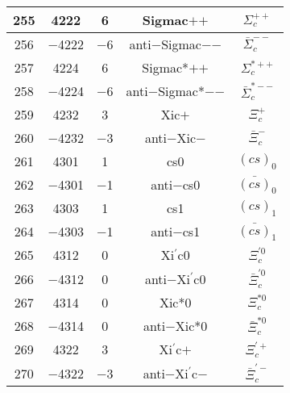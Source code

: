 \documentclass{article}
\begin{document}
\begin{table}[!htbp]
\begin{tabular}{|c|c|c|c|c|}
\hline
255 & 4222 & 6 & Sigma\underline{\hspace{0.6em}}c$+$$+$ & $\Sigma_{c}^{++}$ \\
\hline
256 & $-$4222 & $-$6 & anti$-$Sigma\underline{\hspace{0.6em}}c$-$$-$ & $\bar{\Sigma}_{c}^{--}$ \\
\hline
257 & 4224 & 6 & Sigma\underline{\hspace{0.6em}}c*$+$$+$ & $\Sigma_{c}^{*++}$ \\
\hline
258 & $-$4224 & $-$6 & anti$-$Sigma\underline{\hspace{0.6em}}c*$-$$-$ & $\bar{\Sigma}_{c}^{*--}$ \\
\hline
259 & 4232 & 3 & Xi\underline{\hspace{0.6em}}c$+$ & $\Xi_{c}^{+}$ \\
\hline
260 & $-$4232 & $-$3 & anti$-$Xi\underline{\hspace{0.6em}}c$-$ & $\bar{\Xi}_{c}^{-}$ \\
\hline
261 & 4301 & 1 & cs\underline{\hspace{0.6em}}0 & $(cs)_{0}$ \\
\hline
262 & $-$4301 & $-$1 & anti$-$cs\underline{\hspace{0.6em}}0 & $\bar{(cs)}_{0}$ \\
\hline
263 & 4303 & 1 & cs\underline{\hspace{0.6em}}1 & $(cs)_{1}$ \\
\hline
264 & $-$4303 & $-$1 & anti$-$cs\underline{\hspace{0.6em}}1 & $\bar{(cs)}_{1}$ \\
\hline
265 & 4312 & 0 & Xi$^{\prime}$\underline{\hspace{0.6em}}c0 & $\Xi_{c}^{\prime0}$ \\
\hline
266 & $-$4312 & 0 & anti$-$Xi$^{\prime}$\underline{\hspace{0.6em}}c0 & $\bar{\Xi}_{c}^{\prime0}$ \\
\hline
267 & 4314 & 0 & Xi\underline{\hspace{0.6em}}c*0 & $\Xi_{c}^{*0}$ \\
\hline
268 & $-$4314 & 0 & anti$-$Xi\underline{\hspace{0.6em}}c*0 & $\bar{\Xi}_{c}^{*0}$ \\
\hline
269 & 4322 & 3 & Xi$^{\prime}$\underline{\hspace{0.6em}}c$+$ & $\Xi_{c}^{\prime+}$ \\
\hline
270 & $-$4322 & $-$3 & anti$-$Xi$^{\prime}$\underline{\hspace{0.6em}}c$-$ & $\bar{\Xi}_{c}^{\prime-}$ \\

\end{tabular}
\end{table}
\end{document}
